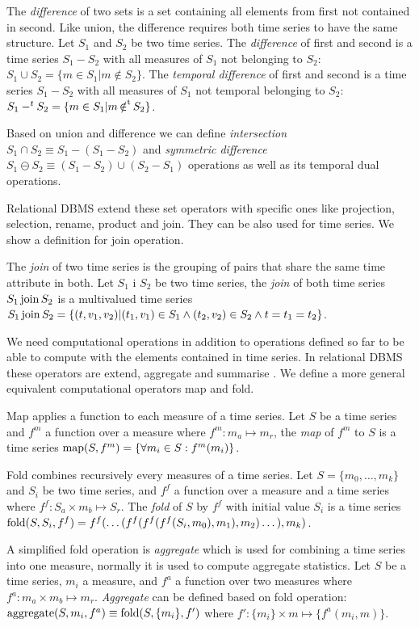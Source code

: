 The \emph{difference} of two sets is a set containing all elements
from first not contained in second. Like union, the difference
requires both time series to have the same structure. %
Let $S_1$ and $S_2$ be two time series. The \emph{difference} of first
and second is a time series $S_1 - S_2$ with all measures of $S_1$ not
belonging to $S_2$: $S_1 \cup S_2 = \{ m \in S_1 | m \notin S_2
\}$. The \emph{temporal difference} of first and second is a time
series $S_1 - S_2$ with all measures of $S_1$ not temporal belonging
to $S_2$: $S_1 -^t S_2 = \{ m \in S_1 | m \operatorname*{\notin^t} S_2 \}$.


Based on union and difference we can define \emph{intersection} $S_1\cap
S_2 \equiv S_1 - (S_1 - S_2)$ and \emph{symmetric difference} $S_1 \ominus
S_2 \equiv (S_1 - S_2) \cup (S_2 - S_1)$ operations as well as its
temporal dual operations.


Relational DBMS extend these set operators with specific ones like
projection, selection, rename, product and join. They can be also used
for time series. We show a definition for join operation.


The \emph{join} of two time series is the grouping of pairs that share
the same time attribute in both.  Let $S_1$ i $S_2$ be two time series,
the \emph{join} of both time series $S_1 \operatorname*{join} S_2$ is a multivalued
time series $S_1 \operatorname*{join} S_2 = \{ (t,v_1,v_2) | (t_1,v_1) \in S_1 \wedge
(t_2,v_2) \in S_2 \wedge t=t_1=t_2 \}$.


We need computational operations in addition to operations defined so
far to be able to compute with the elements contained in time
series. In relational DBMS these operators are extend, aggregate and
summarise \cite{date:introduction}. We define a more general
equivalent computational operators map and fold.


Map applies a function to each measure of a time series.  Let $S$ be a
time series and $f^m$ a function over a measure where $f^m:m_a\mapsto
m_r$, the \emph{map} of $f^m$ to $S$ is a time series $\operatorname*{map}(S,f^m) =
\{\forall m_i\in S : f^m(m_i) \}$.

Fold combines recursively every measures of a time series.  Let
$S=\{m_0, \dotsc, m_k\}$ and $S_i$ be two time series, and $f^f$ a
function over a measure and a time series where $f^f: S_a \times m_b
\mapsto S_r$. The \emph{fold} of $S$ by $f^f$ with initial value $S_i$ is a
time series $\operatorname*{fold}(S,S_i,f^f) = f^f(\dots(
f^f(f^f(f^f(S_i,m_0),\allowbreak m_1),\allowbreak m_2
)\dots),\allowbreak m_k)$.


A simplified fold operation is \emph{aggregate} which
is used for combining a time series into one measure, normally it is
used to compute aggregate statistics.  Let $S$ be a time series, $m_i$
a measure, and $f^a$ a function over two measures where $f^a: m_a
\times m_b \mapsto m_r$.  \emph{Aggregate} can be defined based on
fold operation: $\operatorname*{aggregate}(S,m_i,f^a) \equiv \operatorname*{fold}(S,\{m_i\},f')$ where $f':
\{m_i\} \times m \mapsto \{f^a(m_i,m)\}$.

